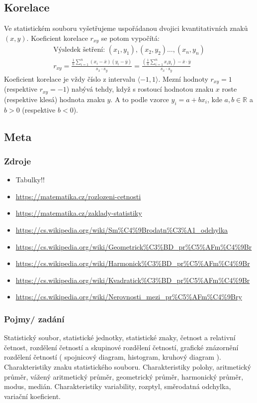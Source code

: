 \documentclass[12pt]{article}
\begin{document}
\subsection{Korelace}
Ve statistickém souboru vyšetřujeme uspořádanou dvojici kvantitativních znaků $(x,y)$. Koeficient korelace $r_{xy}$ se potom vypočítá:
\begin{align}
\text{Výsledek šetření: 	} (x_1,y_1),(x_2,y_2) \dotsc, (x_n, y_n)\\
r_{xy} = \frac{\frac{1}{n} \sum\limits^n_{i=1}\left(x_i - \overline{x}\right) \left(y_i - \overline{y}\right)}{s_x \cdot s_y} = \frac{\left( \frac{1}{n} \sum\limits^n_{i=1}x_i y_i \right)-\overline{x}\cdot\overline{y}}{s_x \cdot s_y}
\end{align}
Koeficient korelace je vždy číslo z intervalu $\langle -1, 1 \rangle$. Mezní hodnoty $r_{xy} = 1$ (respektive $r_{xy} = -1$) nabývá tehdy, když s rostoucí hodnotou znaku $x$ roste (respektive klesá) hodnota znaku $y$. A to podle vzorce $y_i = a + b x_i$, kde $a,b \in \mathbb{R}$ a $b >0$ (respektive $b<0$).
\subsection{Meta}
\subsubsection{Zdroje}
\begin{itemize}
\item Tabulky!!
\item \url{https://matematika.cz/rozlozeni-cetnosti}
\item \url{https://matematika.cz/zaklady-statistiky}
\item \url{https://cs.wikipedia.org/wiki/Sm\%C4\%9Brodatn\%C3\%A1_odchylka}
\item \url{https://cs.wikipedia.org/wiki/Geometrick\%C3\%BD_pr\%C5\%AFm\%C4\%9Br}
\item \url{https://cs.wikipedia.org/wiki/Harmonick\%C3\%BD_pr\%C5\%AFm\%C4\%9Br}
\item \url{https://cs.wikipedia.org/wiki/Kvadratick\%C3\%BD_pr\%C5\%AFm\%C4\%9Br}
\item \url{https://cs.wikipedia.org/wiki/Nerovnosti_mezi_pr\%C5\%AFm\%C4\%9Bry}
\end{itemize}
\subsubsection{Pojmy/ zadání}
Statistický soubor, statistické jednotky, statistické znaky, četnost a relativní četnost, rozdělení četností a skupinové rozdělení četností, grafické znázornění rozdělení četností ( spojnicový diagram, histogram, kruhový diagram ). Charakteristiky znaku statistického souboru. Charakteristiky polohy, aritmetický průměr, vážený aritmetický průměr, geometrický průměr, harmonický průměr, modus, medián. Charakteristiky variability, rozptyl, směrodatná odchylka, variační koeficient.
\end{document}
